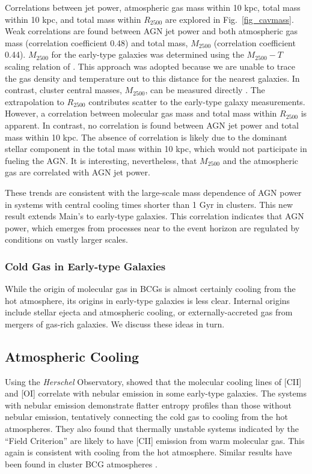 \documentclass[iop]{emulateapj}
\begin{document}
Correlations between jet power, atmospheric gas mass within 10 kpc, total mass within 10 kpc, and total mass within $R_{2500}$ are explored in Fig.~\ref{fig_cavmass}. Weak correlations are found between AGN jet power and both atmospheric gas mass (correlation coefficient 0.48) and total mass, $M_{2500}$ (correlation coefficient 0.44).  $M_{2500}$ for the early-type galaxies was determined using the $M_{2500}-T$ scaling relation of \citet{Vikhlinin:06}. This approach was adopted because we are unable to trace the gas density and temperature out to this distance for the nearest galaxies. In contrast, cluster central masses, $M_{2500}$, can be measured directly \citep{Hogan:17a, Pulido:17}. The extrapolation to $R_{2500}$ contributes scatter to the early-type galaxy measurements. However, a correlation between molecular gas mass and total mass within $R_{2500}$ is apparent. In contrast, no correlation is found between AGN jet power and total mass within 10 kpc. The absence of correlation is likely due to the dominant stellar component in the total mass within 10 kpc, which would not participate in fueling the AGN. It is interesting, nevertheless, that $M_{2500}$ and the atmospheric gas are correlated with AGN jet power.

These trends are consistent with the large-scale mass dependence of AGN power in systems with central cooling times shorter than 1 Gyr \citep{Main:17} in clusters. This new result extends Main's to early-type galaxies. This correlation indicates that AGN power, which emerges from processes near to the event horizon are regulated by conditions on vastly larger scales.

\subsubsection{Cold Gas in Early-type Galaxies}
While the origin of molecular gas in BCGs is almost certainly cooling from the hot atmosphere, its origins in early-type galaxies is less clear. Internal origins include stellar ejecta and atmospheric cooling, or externally-accreted gas from mergers of gas-rich galaxies. We discuss these ideas in turn.

\subsection{Atmospheric Cooling}

Using the {\it Herschel} Observatory, \citet{Werner:14} showed that the molecular cooling lines of [CII] and [OI] correlate with nebular emission in some early-type galaxies. The systems with nebular emission demonstrate flatter entropy profiles than those without nebular emission, tentatively connecting the cold gas to cooling from the hot atmospheres. They also found that thermally unstable systems indicated by the ``Field Criterion'' are likely to have [CII] emission from warm molecular gas. This again is consistent with cooling from the hot atmosphere. Similar results have been found in cluster BCG atmospheres \citep{Voit:08, Rafferty:08, Cavagnolo:08}. 
\end{document}
